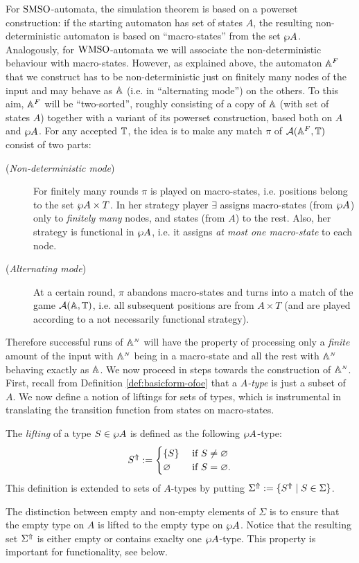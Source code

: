For $\mathrm{SMSO}$-automata, the simulation theorem is based on a powerset construction:
if the starting automaton has set of states $A$, the resulting non-deterministic
automaton is based on ``macro-states'' from the set $\wp A$.
Analogously, for $\mathrm{WMSO}$-automata we will associate the non-deterministic
behaviour with macro-states.
However, as explained above, the automaton $\mathbb{A}^{F}$ that we construct has to
be non-deterministic just on finitely many nodes of the input and may behave as
$\mathbb{A}$ (i.e. in ``alternating mode'') on the others.
To this aim, $\mathbb{A}^{F}$ will be ``two-sorted'', roughly consisting of a copy of
$\mathbb{A}$ (with set of states $A$) together with a variant of its powerset construction,
based both on $A$ and $\wp A$.
For any accepted $\mathbb{T}$, the idea is to make any match $\pi$ of
$\mathcal{A}(\mathbb{A}^{F},\mathbb{T})$ consist of two parts:
\begin{description}
\item[(\textit{Non-deterministic mode})] For finitely many rounds $\pi$ is
  played on macro-states, i.e. positions belong to the set $\wp A \times T$.
  In her strategy player $\exists$ assigns macro-states (from $\wp A$) only to
  \emph{finitely many} nodes, and states (from $A$) to the rest.
  Also, her strategy is functional in $\wp A$, i.e. it assigns \emph{at most one
  macro-state} to each node.
\item[(\textit{Alternating mode})] At a certain round, $\pi$ abandons
  macro-states and turns into a match of the game $\mathcal{A}(\mathbb{A},\mathbb{T})$, i.e. all
  subsequent positions are from $A \times T$ (and are played according to a
  not necessarily functional strategy).
\end{description}
Therefore successful runs of $\mathbb{A}^{{\scriptscriptstyle N}}$ will have the property of processing 
only a \emph{finite} amount of the input with $\mathbb{A}^{{\scriptscriptstyle N}}$ being in a 
macro-state and all the rest with $\mathbb{A}^{{\scriptscriptstyle N}}$ behaving exactly as $\mathbb{A}$.
We now proceed in steps towards the construction of $\mathbb{A}^{{\scriptscriptstyle N}}$. 
First, recall from Definition \ref{def:basicform-ofoe} that a \emph{$A$-type} is
just a subset of $A$. 
We now define a notion of liftings for sets of types, which is instrumental in
translating the transition function from states on macro-states.

\begin{definition}
The \emph{lifting} of a type $S \in \wp A$ is defined as the following
$\wp A$-type:
\[
\lift{S} \isdef 
\begin{cases} \{ S \} & \text{ if } S \neq \nada \\
\nada & \text{ if } S = \nada.
\end{cases}
\]
This definition is extended to sets of $A$-types by putting $\Sigma^{\Uparrow} 
\mathrel{:=} \{ S^{\Uparrow} \mid S \in \Sigma \}$.
\end{definition}
The distinction between empty and non-empty elements of $\Sigma$ is to ensure 
that the empty type on $A$ is lifted to the empty type on $\wp A$. 
Notice that the resulting set $\Sigma^{\Uparrow}$ is either empty or 
contains exaclty one $\wp A$-type.
This property is important for functionality, see below.

